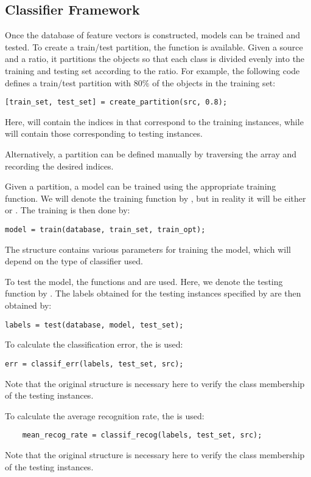 \documentclass{article}
\begin{document}
\subsection{Classifier Framework}
Once the database of feature vectors is constructed, models can be trained and tested. To create a train/test partition, the function  is available. Given a source  and a ratio, it partitions the objects so that each class is divided evenly into the training and testing set according to the ratio. For example, the following code defines a train/test partition with $80\%$ of the objects in the training set:
\begin{lstlisting}
[train_set, test_set] = create_partition(src, 0.8);
\end{lstlisting}
Here,  will contain the indices in  that correspond to the training instances, while  will contain those corresponding to testing instances.

Alternatively, a partition can be defined manually by traversing the  array and recording the desired indices.

Given a partition, a model can be trained using the appropriate training function. We will denote the training function by , but in reality it will be either  or . The training is then done by:
\begin{lstlisting}
model = train(database, train_set, train_opt);
\end{lstlisting}
The structure  contains various parameters for training the model, which will depend on the type of classifier used.

To test the model, the functions  and  are used. Here, we denote the testing function by . The labels obtained for the testing instances specified by  are then obtained by:
\begin{lstlisting}
labels = test(database, model, test_set);
\end{lstlisting}
To calculate the classification error, the  is used:
\begin{lstlisting}
err = classif_err(labels, test_set, src);
\end{lstlisting}
Note that the original  structure is necessary here to verify the class membership of the testing instances.

To calculate the average recognition rate, the  is used:
\begin{lstlisting}
    mean_recog_rate = classif_recog(labels, test_set, src);
\end{lstlisting}
Note that the original  structure is necessary here to verify the class membership of the testing instances.
\end{document}
